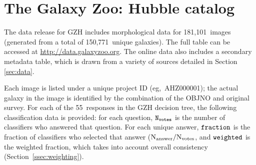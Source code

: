 \documentclass[twocolumn]{aastex6}
\begin{document}
%
%
%
%
%
%
%

\section{The Galaxy Zoo: Hubble catalog}\label{sec:results}

The data release for GZH includes morphological data for 181,101~images
(generated from a total of 150,771~unique galaxies). The full table can be
accessed at \url{http://data.galaxyzoo.org}. The online data also includes a
secondary metadata table, which is drawn from a variety of sources detailed in
Section \ref{sec:data}.

Each image is listed under a unique project ID (eg,~AHZ000001); the actual
galaxy in the image is identified by the combination of the OBJNO and original
survey. For each of the 55~responses in the GZH decision tree, the following
classification data is provided: for each question, $\tt N_{votes}$ is the
number of classifiers who answered that question. For each unique answer, $\tt fraction$
is the fraction of classifiers who selected that answer ($\rm N_{answer}/N_{votes}$, and
$\tt weighted$ is the weighted fraction, which takes into account overall
consistency (Section~\ref{ssec:weighting}). 
\end{document}

